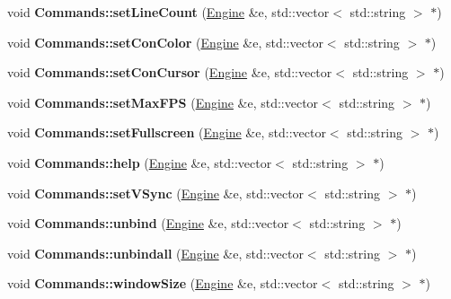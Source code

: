 \begin{DoxyCompactItemize}
\item 
void {\bfseries Commands\+::set\+Line\+Count} (\hyperlink{classEngine}{Engine} \&e, std\+::vector$<$ std\+::string $>$ $\ast$)\hypertarget{Commands_8hh_a4bbf986e8df887b1eff58b289b1de43c}{}\label{Commands_8hh_a4bbf986e8df887b1eff58b289b1de43c}

\item 
void {\bfseries Commands\+::set\+Con\+Color} (\hyperlink{classEngine}{Engine} \&e, std\+::vector$<$ std\+::string $>$ $\ast$)\hypertarget{Commands_8hh_a555ae35c352b88fabdfc5626330ec99c}{}\label{Commands_8hh_a555ae35c352b88fabdfc5626330ec99c}

\item 
void {\bfseries Commands\+::set\+Con\+Cursor} (\hyperlink{classEngine}{Engine} \&e, std\+::vector$<$ std\+::string $>$ $\ast$)\hypertarget{Commands_8hh_a4794ec0d1c5f50648a2a402385d7a5f8}{}\label{Commands_8hh_a4794ec0d1c5f50648a2a402385d7a5f8}

\item 
void {\bfseries Commands\+::set\+Max\+F\+PS} (\hyperlink{classEngine}{Engine} \&e, std\+::vector$<$ std\+::string $>$ $\ast$)\hypertarget{Commands_8hh_a7255de2b4d70815909af4fe083683d25}{}\label{Commands_8hh_a7255de2b4d70815909af4fe083683d25}

\item 
void {\bfseries Commands\+::set\+Fullscreen} (\hyperlink{classEngine}{Engine} \&e, std\+::vector$<$ std\+::string $>$ $\ast$)\hypertarget{Commands_8hh_a95557710844e794e112337d7d6f7cdff}{}\label{Commands_8hh_a95557710844e794e112337d7d6f7cdff}

\item 
void {\bfseries Commands\+::help} (\hyperlink{classEngine}{Engine} \&e, std\+::vector$<$ std\+::string $>$ $\ast$)\hypertarget{Commands_8hh_ac172f253b5f32b4dddce8387fbc5c90f}{}\label{Commands_8hh_ac172f253b5f32b4dddce8387fbc5c90f}

\item 
void {\bfseries Commands\+::set\+V\+Sync} (\hyperlink{classEngine}{Engine} \&e, std\+::vector$<$ std\+::string $>$ $\ast$)\hypertarget{Commands_8hh_a403664e9d64fa9f76ae4e09d37dc86cd}{}\label{Commands_8hh_a403664e9d64fa9f76ae4e09d37dc86cd}

\item 
void {\bfseries Commands\+::unbind} (\hyperlink{classEngine}{Engine} \&e, std\+::vector$<$ std\+::string $>$ $\ast$)\hypertarget{Commands_8hh_aecb0f8c2aa97a861b3f7e096fa1c3753}{}\label{Commands_8hh_aecb0f8c2aa97a861b3f7e096fa1c3753}

\item 
void {\bfseries Commands\+::unbindall} (\hyperlink{classEngine}{Engine} \&e, std\+::vector$<$ std\+::string $>$ $\ast$)\hypertarget{Commands_8hh_aaf5fdc6ec45762f26fdd7c5edf9aeb55}{}\label{Commands_8hh_aaf5fdc6ec45762f26fdd7c5edf9aeb55}

\item 
void {\bfseries Commands\+::window\+Size} (\hyperlink{classEngine}{Engine} \&e, std\+::vector$<$ std\+::string $>$ $\ast$)\hypertarget{Commands_8hh_a1877584a3f78f6e917ad075f6f047c27}{}\label{Commands_8hh_a1877584a3f78f6e917ad075f6f047c27}

\end{DoxyCompactItemize}
